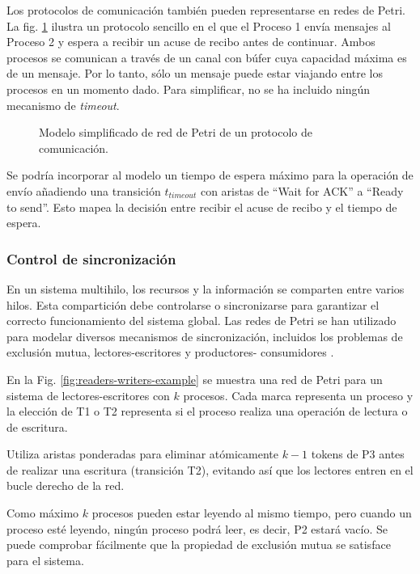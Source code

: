 Los protocolos de comunicación también pueden representarse en redes de Petri.
La fig. \ref{fig:communication-protocols-example}
ilustra un protocolo sencillo en el que el Proceso 1 envía mensajes al Proceso 2 y espera a
recibir un acuse de recibo antes de continuar.
Ambos procesos se comunican a través de un
canal con búfer cuya capacidad máxima es de un mensaje.
Por lo tanto, sólo un mensaje puede
estar viajando entre los procesos en un momento dado.
Para simplificar, no se ha incluido ningún mecanismo de \emph{timeout}.

\begin{figure}[!htbp]
      \centering
      
      \caption{Modelo simplificado de red de Petri de un protocolo de comunicación.}
      \label{fig:communication-protocols-example}
\end{figure}

Se podría incorporar al modelo un tiempo de espera máximo para la operación de envío añadiendo una
transición $t_{timeout}$ con aristas de ``Wait for ACK'' a ``Ready to send''.
Esto mapea la decisión entre recibir el acuse de recibo y el tiempo de espera.

\subsubsection{Control de sincronización}

En un sistema multihilo, los recursos y la información se comparten entre varios hilos. Esta
compartición debe controlarse o sincronizarse para garantizar el correcto funcionamiento del
sistema global. Las redes de Petri se han utilizado para modelar diversos mecanismos de
sincronización, incluidos los problemas de exclusión mutua, lectores-escritores y productores-
consumidores \cite{murata1989}.

En la Fig. \ref{fig:readers-writers-example} se muestra una red de Petri para un sistema de lectores-escritores con $k$ procesos.
Cada marca representa un proceso y la elección de T1 o T2 representa si el proceso realiza una
operación de lectura o de escritura.

Utiliza aristas ponderadas para eliminar atómicamente $k - 1$ tokens de P3 antes de realizar una
escritura (transición T2), evitando así que los lectores entren en el bucle derecho de la red.

Como máximo $k$ procesos pueden estar leyendo al mismo tiempo, pero cuando un proceso esté
leyendo, ningún proceso podrá leer, es decir, P2 estará vacío. Se puede comprobar fácilmente
que la propiedad de exclusión mutua se satisface para el sistema.

